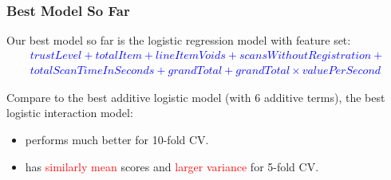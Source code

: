 \documentclass{beamer}
\begin{document}
\begin{frame}
\frametitle{Best Model So Far}
Our best model so far is the logistic regression model with feature set:
\textcolor{blue}{
\begin{align*}
trustLevel + totalItem + lineItemVoids + scansWithoutRegistration +\\
 totalScanTimeInSeconds + grandTotal +  grandTotal \times valuePerSecond
\end{align*}
}


\vspace{-1.5em}
\begin{table}[H]
\end{table}


Compare to the best additive logistic model (with 6 additive terms), the best logistic interaction model:
\begin{itemize}
\item performs much better for 10-fold CV.
\item has \textcolor{red}{similarly mean} scores and \textcolor{red}{larger variance} for 5-fold CV.
\end{itemize}



\end{frame}
\end{document}
